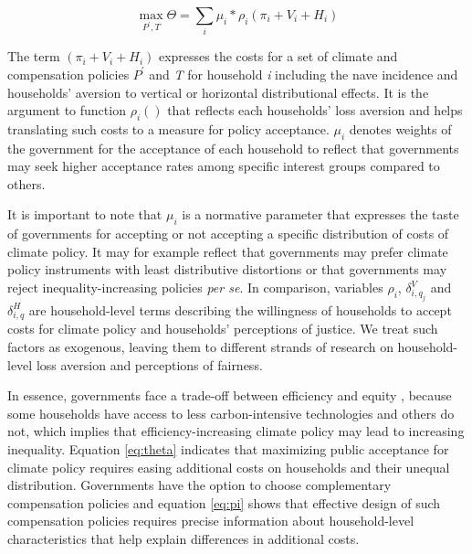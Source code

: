 \documentclass[12pt, a4paper]{article}
\begin{document}
\begin{equation} \label{eq:theta}
    \max_{P^{\prime},T} \Theta = \sum_{i} \mu_{i} * \rho_{i}(\pi_{i} + V_{i} + H_{i})
\end{equation}

The term $(\pi_{i} + V_{i} + H_{i})$ expresses the costs for a set of climate and compensation policies $P^{\prime}$ and \textit{T} for household \textit{i} including the nave incidence and households' aversion to vertical or horizontal distributional effects. It is the argument to function $\rho_{i}()$ that reflects each households' loss aversion \autocite{Tversky.1991} and helps translating such costs to a measure for policy acceptance. $\mu_{i}$ denotes weights of the government for the acceptance of each household to reflect that governments may seek higher acceptance rates among specific interest groups compared to others.

It is important to note that $\mu_{i}$ is a normative parameter that expresses the taste of governments for accepting or not accepting a specific distribution of costs of climate policy. It may for example reflect that governments may prefer climate policy instruments with least distributive distortions \autocite{Fischer.2019} or that governments may reject inequality-increasing policies \textit{per se}. In comparison, variables $\rho_{i}$, $\delta_{i,q_{j}}^{V}$ and $\delta_{i,q}^{H}$ are household-level terms describing the willingness of households to accept costs for climate policy and households' perceptions of justice. We treat such factors as exogenous, leaving them to different strands of research on household-level loss aversion and perceptions of fairness. 

In essence, governments face a trade-off between efficiency and equity \autocite{Hansel.2022,TerryDinan.2016}, because some households have access to less carbon-intensive technologies and others do not, which implies that efficiency-increasing climate policy may lead to increasing inequality. Equation \ref{eq:theta} indicates that maximizing public acceptance for climate policy requires easing additional costs on households and their unequal distribution. Governments have the option to choose complementary compensation policies and equation \ref{eq:pi} shows that effective design of such compensation policies requires precise information about household-level characteristics that help explain differences in additional costs. 
\end{document}
